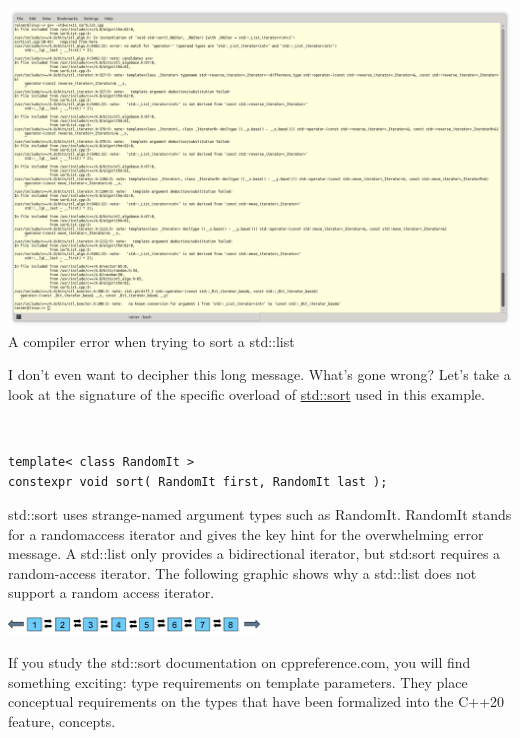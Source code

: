 \begin{center}
\includegraphics[width=1.0\textwidth]{content/3/chapter4/images/4.png}\\
A compiler error when trying to sort a std::list
\end{center}

I don’t even want to decipher this long message. What’s gone wrong? Let’s take a look at the signature of the specific overload of \href{https://en.cppreference.com/w/cpp/algorithm/sort}{std::sort} used in this example.

\hspace*{\fill} \\ %
\begin{lstlisting}[style=styleCXX]
template< class RandomIt >
constexpr void sort( RandomIt first, RandomIt last );
\end{lstlisting}

std::sort uses strange-named argument types such as RandomIt. RandomIt stands for a randomaccess iterator and gives the key hint for the overwhelming error message. A std::list only provides a bidirectional iterator, but std:sort requires a random-access iterator. The following graphic shows why a std::list does not support a random access iterator.

\begin{center}
\includegraphics[width=0.5\textwidth]{content/3/chapter4/images/5.png}\\
\end{center}

If you study the std::sort documentation on cppreference.com, you will find something exciting: type requirements on template parameters. They place conceptual requirements on the types that have been formalized into the C++20 feature, concepts.

